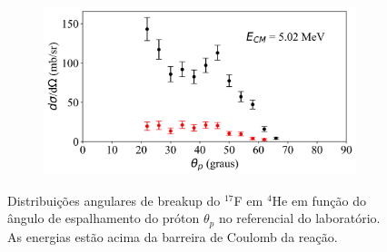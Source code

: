 \documentclass[a4paper,12pt,oneside]{book}
\begin{document}
\begin{figure}[H]
\begin{subfigure}[b]{0.48\textwidth}
        \caption{}
        \label{subfig:dist_ang_f}
    \end{subfigure}
    \begin{subfigure}[b]{0.49\textwidth}
        \centering
        \includegraphics[scale=0.38, width=1.\columnwidth]{figs/dist_angs/dist_ang_6.png}
        \caption{}
        \label{subfig:dist_ang_g}
    \end{subfigure}
\caption{Distribuições angulares de breakup do $^{17}$F em $^4$He em função do ângulo de espalhamento do próton $\theta_p$ no referencial do laboratório. As energias estão acima da barreira de Coulomb da reação.}
\label{fig:dist_ang_acima}
\end{figure}
\end{document}
